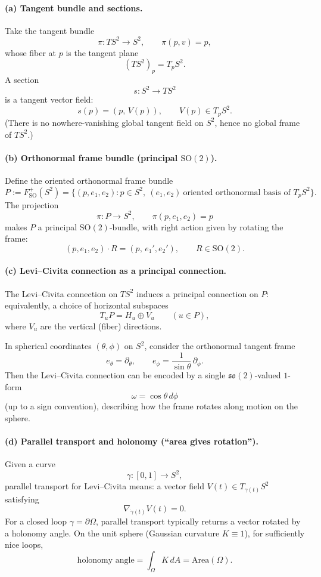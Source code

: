 \documentclass[12pt,a4paper]{article}
\theoremstyle{plain}
\theoremstyle{definition}      %
\begin{document}
\paragraph{(a) Tangent bundle and sections.}
Take the tangent bundle
\[
\pi:TS^2\to S^2,
\qquad
\pi(p,v)=p,
\]
whose fiber at $p$ is the tangent plane
\[
(TS^2)_p = T_pS^2.
\]
A section
\[
s:S^2\to TS^2
\]
is a tangent vector field:
\[
s(p)=(p,\,V(p)),\qquad V(p)\in T_pS^2.
\]
(There is no nowhere-vanishing global tangent field on $S^2$, hence no global frame of $TS^2$.)

\paragraph{(b) Orthonormal frame bundle (principal $\mathrm{SO}(2)$).}
Define the oriented orthonormal frame bundle
\[
P := F_{\mathrm{SO}}^+(S^2)
= \bigl\{(p,e_1,e_2): p\in S^2,\ (e_1,e_2)\ \text{oriented orthonormal basis of }T_pS^2\bigr\}.
\]
The projection
\[
\pi:P\to S^2,\qquad \pi(p,e_1,e_2)=p
\]
makes $P$ a principal $\mathrm{SO}(2)$-bundle, with right action given by rotating the frame:
\[
(p,e_1,e_2)\cdot R
=
(p,\,e_1',e_2'),
\qquad
R\in \mathrm{SO}(2).
\]

\paragraph{(c) Levi--Civita connection as a principal connection.}
The Levi--Civita connection on $TS^2$ induces a principal connection on $P$:
equivalently, a choice of horizontal subspaces
\[
T_uP = H_u \oplus V_u
\qquad (u\in P),
\]
where $V_u$ are the vertical (fiber) directions.

In spherical coordinates $(\theta,\phi)$ on $S^2$, consider the orthonormal tangent frame
\[
e_\theta = \partial_\theta,
\qquad
e_\phi = \frac{1}{\sin\theta}\,\partial_\phi.
\]
Then the Levi--Civita connection can be encoded by a single $\mathfrak{so}(2)$-valued $1$-form
\[
\omega = \cos\theta\, d\phi
\]
(up to a sign convention), describing how the frame rotates along motion on the sphere.

\paragraph{(d) Parallel transport and holonomy (``area gives rotation'').}
Given a curve
\[
\gamma:[0,1]\to S^2,
\]
parallel transport for Levi--Civita means: a vector field $V(t)\in T_{\gamma(t)}S^2$ satisfying
\[
\nabla_{\dot\gamma(t)}V(t)=0.
\]
For a closed loop $\gamma=\partial\Omega$, parallel transport typically returns a vector rotated by a holonomy angle.
On the unit sphere (Gaussian curvature $K\equiv 1$), for sufficiently nice loops,
\[
\text{holonomy angle} = \int_{\Omega} K\, dA = \mathrm{Area}(\Omega).
\]
\end{document}
